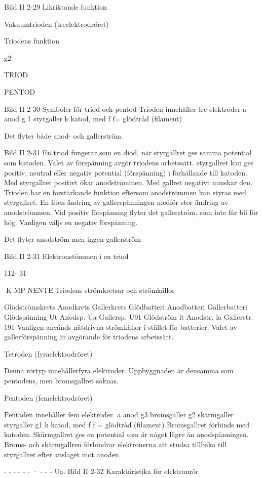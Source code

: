 {{Bild II 2-29 Likriktande funktion

Vakuumtrioden (treelektrodröret)

Triodens funktion

g2

TRIOD

PENTOD

Bild II 2-30 Symboler för triod och pentod
Trioden innehåller tre elektroder
a anod
g 1 styrgaller
k katod, med f f= glödtråd (filament)

Det flyter både anod- och gallerström

Bild II 2-31
En triod fungerar som en diod, när styrgallret
ges samma potential som katoden. Valet av
förspänning avgör triodens arbetssätt. styrgallret kan ges positiv, neutral eller negativ
potential (förspänning) i förhållande till katoden. Med styrgallret positivt ökar anodströmmen. Med gallret negativt minskar den.
Trioden har en förstärkande funktion eftersom anodströmmen kan styras med styrgallret. En liten ändring av gallerspänningen
medför stor ändring av anodströmmen. Vid
positiv förspänning flyter det gallerström,
som inte får bli för hög. Vanligen väljs en
negativ förspänning.

Det flyter anodström men ingen gallerström

Bild II 2-31 Elektronstömmen i en triod

112- 31

K MP NENTE
Triodens strömkretsar och strömkällor

Glödströmskrets Anodkrets Gallerkrets
Glödbatteri
Anodbatteri Gallerbatteri
Glödspänning Ut Anodsp. Ua Gallersp. U91
Glödström lt
Anodstr. la Gallerstr. 191
Vanligen används nätdrivna strömkällor i
stället för batterier.
Valet av gallerförspänning är avgörande för
triodens arbetssätt.

Tetroden (fyraelektrodröret)

Denna rörtyp innehållerfyra elektroder. Uppbyggnaden är densamma som pentodens,
men bromsgallret saknas.

Pentoden (femelektrodröret)

Pentaden innehåller fem elektroder.
a
anod
g3
bromsgaller
g2
skärmgaller
styrgaller
g1
k
katod, med f f = glödtråd (filament)
Bromsgallret förbinds med katoden. Skärmgallret ges en potential som är något lägre än
anodspänningen. Broms- och skärmgallren
förhindrar elektronerna att studsa tillbaka till
styrgallret efter anslaget mot anoden.

- - - - - - · - - - Ua.
Bild II 2-32 Karaktäristika för elektronrör

}}
